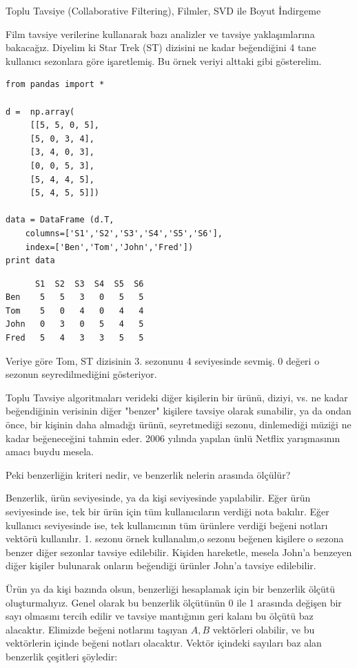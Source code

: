 \documentclass[12pt,fleqn]{article}\usepackage{../../common}
\begin{document}
Toplu Tavsiye (Collaborative Filtering), Filmler, SVD ile Boyut İndirgeme

Film tavsiye verilerine kullanarak bazı analizler ve tavsiye yaklaşımlarına
bakacağız. Diyelim ki Star Trek (ST) dizisini ne kadar beğendiğini 4 tane
kullanıcı sezonlara göre işaretlemiş. Bu örnek veriyi alttaki gibi gösterelim.

\begin{verbatim}
from pandas import *

d =  np.array(
     [[5, 5, 0, 5],
     [5, 0, 3, 4],
     [3, 4, 0, 3],
     [0, 0, 5, 3],
     [5, 4, 4, 5],
     [5, 4, 5, 5]])

data = DataFrame (d.T,
    columns=['S1','S2','S3','S4','S5','S6'],
    index=['Ben','Tom','John','Fred'])
print data
\end{verbatim}

\begin{verbatim}
      S1  S2  S3  S4  S5  S6
Ben    5   5   3   0   5   5
Tom    5   0   4   0   4   4
John   0   3   0   5   4   5
Fred   5   4   3   3   5   5
\end{verbatim}

Veriye göre Tom, ST dizisinin 3. sezonunu 4 seviyesinde sevmiş. 0
değeri o sezonun seyredilmediğini gösteriyor.

Toplu Tavsiye algoritmaları verideki diğer kişilerin bir ürünü, diziyi, vs. ne
kadar beğendiğinin verisinin diğer "benzer" kişilere tavsiye olarak sunabilir,
ya da ondan önce, bir kişinin daha almadığı ürünü, seyretmediği sezonu,
dinlemediği müziği ne kadar beğeneceğini tahmin eder. 2006 yılında yapılan ünlü
Netflix yarışmasının amacı buydu mesela.

Peki benzerliğin kriteri nedir, ve benzerlik nelerin arasında ölçülür?

Benzerlik, ürün seviyesinde, ya da kişi seviyesinde yapılabilir. Eğer ürün
seviyesinde ise, tek bir ürün için tüm kullanıcıların verdiği nota
bakılır. Eğer kullanıcı seviyesinde ise, tek kullanıcının tüm ürünlere
verdiği beğeni notları vektörü kullanılır. 1. sezonu örnek kullanalım,o
sezonu beğenen kişilere o sezona benzer diğer sezonlar tavsiye
edilebilir. Kişiden hareketle, mesela John'a benzeyen diğer kişiler
bulunarak onların beğendiği ürünler John'a tavsiye edilebilir.

Ürün ya da kişi bazında olsun, benzerliği hesaplamak için bir benzerlik
ölçütü oluşturmalıyız. Genel olarak bu benzerlik ölçütünün 0 ile 1 arasında
değişen bir sayı olmasını tercih edilir ve tavsiye mantığının geri kalanı
bu ölçütü baz alacaktır. Elimizde beğeni notlarını taşıyan $A,B$ vektörleri
olabilir, ve bu vektörlerin içinde beğeni notları olacaktır. Vektör
içindeki sayıları baz alan benzerlik çeşitleri şöyledir:
\end{document}
